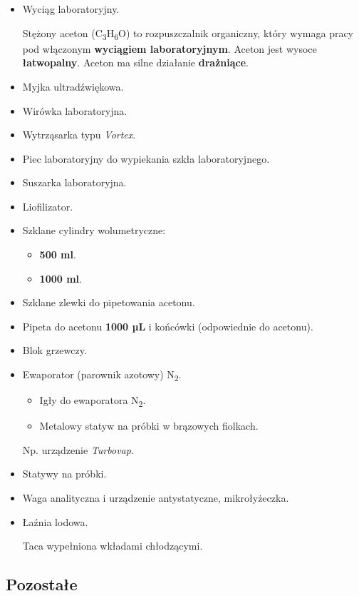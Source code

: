 \documentclass[
  letterpaper,
  DIV=11,
  numbers=noendperiod]{scrreprt}
\begin{document}
\begin{itemize}
\item
  Wyciąg laboratoryjny.

  Stężony aceton (C\textsubscript{3}H\textsubscript{6}O) to
  rozpuszczalnik organiczny, który wymaga pracy pod włączonym
  \textbf{wyciągiem laboratoryjnym}. Aceton jest wysoce
  \textbf{łatwopalny}. Aceton ma silne działanie \textbf{drażniące}.
\item
  Myjka ultradźwiękowa.
\item
  Wirówka laboratoryjna.
\item
  Wytrząsarka typu \emph{Vortex}.
\item
  Piec laboratoryjny do wypiekania szkła laboratoryjnego.
\item
  Suszarka laboratoryjna.
\item
  Liofilizator.
\item
  Szklane cylindry wolumetryczne:

  \begin{itemize}
  \item
    \textbf{500 ml}.
  \item
    \textbf{1000 ml}.
  \end{itemize}
\item
  Szklane zlewki do pipetowania acetonu.
\item
  Pipeta do acetonu \textbf{1000 µL} i końcówki (odpowiednie do
  acetonu).
\item
  Blok grzewczy.
\item
  Ewaporator (parownik azotowy) N\textsubscript{2}.

  \begin{itemize}
  \item
    Igły do ewaporatora N\textsubscript{2}.
  \item
    Metalowy statyw na próbki w brązowych fiolkach.
  \end{itemize}

  Np. urządzenie \emph{Turbovap}.
\item
  Statywy na próbki.
\item
  Waga analityczna i urządzenie antystatyczne, mikrołyżeczka.
\item
  Łaźnia lodowa.

  Taca wypełniona wkładami chłodzącymi.
\end{itemize}

\hypertarget{pozostaux142e-1}{%
\subsection{Pozostałe}\label{pozostaux142e-1}}
\end{document}
